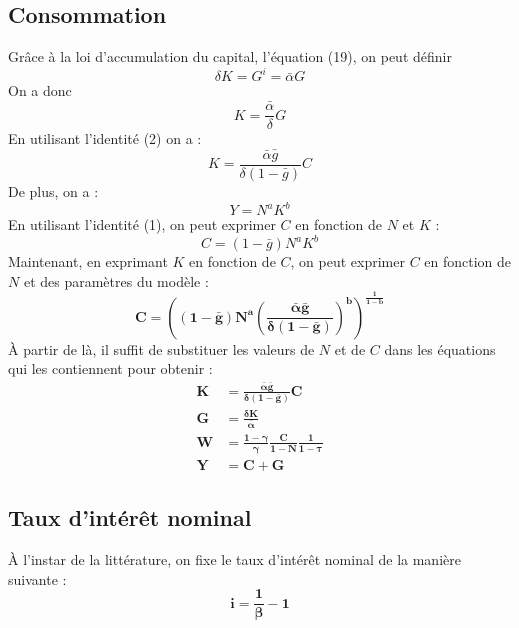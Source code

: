 \documentclass[12pt,letterpaper]{article}
\newcommand{\gbar}{\bar{g}}
\newcommand{\abar}{\bar{\alpha}}
\begin{document}
\subsection*{Consommation}

Grâce à la loi d’accumulation du capital, l’équation (19), on peut définir
\begin{equation*}
\delta K = G^i = \abar G
\end{equation*}
On a donc
\begin{equation*}
K = \frac{\abar}{\delta}G
\end{equation*}
En utilisant l’identité (2) on a :
\begin{equation*}
K = \frac{\abar\gbar}{\delta(1-\gbar)}C
\end{equation*}
De plus, on a :
\begin{equation*}
Y = N^a K^b
\end{equation*}
En utilisant l’identité (1), on peut exprimer $C$ en fonction de $N$ et $K$ :
\begin{equation*}
C = (1-\gbar)N^a K^b
\end{equation*}
Maintenant, en exprimant $K$ en fonction de $C$, on peut exprimer $C$ en fonction de $N$ et des paramètres du modèle :
\begin{equation*}
\boldsymbol{C = \left((1-\gbar)N^a\left(\frac{\abar\gbar}{\delta(1-\gbar)}\right)^b\right)^{\frac{1}{1-b}}}
\end{equation*}
À partir de là, il suffit de substituer les valeurs de $N$ et de $C$ dans les équations qui les contiennent pour obtenir :
\begin{align*}
\boldsymbol{K} &\boldsymbol{= \frac{\abar\gbar}{\delta(1-\gbar)}C}\\
\boldsymbol{G} &\boldsymbol{= \frac{\delta K}{\abar}}\\
\boldsymbol{W} &\boldsymbol{= \frac{1-\gamma}{\gamma}\frac{C}{1-N}\frac{1}{1-\tau}}\\
\boldsymbol{Y} &\boldsymbol{= C+G}
\end{align*}

\subsection*{Taux d’intérêt nominal}

À l’instar de la littérature, on fixe le taux d’intérêt nominal de la manière suivante :
\begin{equation*}
\boldsymbol{i = \frac{1}{\beta} - 1}
\end{equation*}
\end{document}
